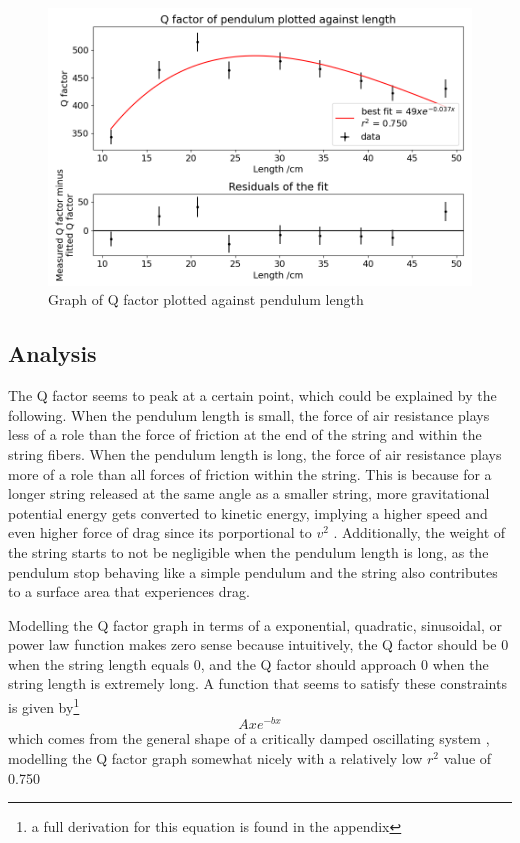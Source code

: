\documentclass[11pt]{article}
\begin{document}
\begin{multicols}{2}
{\begin{figure}[H]
    \centering
    \includegraphics[width=\linewidth]{../figures/qfactor_vs_length.png}
    \caption{\centering Graph of Q factor plotted against pendulum length}
    \label{fig:figure 8}
\end{figure}

\subsection{Analysis}
The Q factor seems to peak at a certain point, which could be explained by the following. When the pendulum length is small, the force of air resistance plays less of a role than the force of friction at the end of the string and within the string fibers. When the pendulum length is long, the force of air resistance plays more of a role than all forces of friction within the string. This is because for a longer string released at the same angle as a smaller string, more gravitational potential energy gets converted to kinetic energy, implying a higher speed and even higher force of drag since its porportional to $v^2$ \cite{airdrag}. Additionally, the weight of the string starts to not be negligible when the pendulum length is long, as the pendulum stop behaving like a simple pendulum and the string also contributes to a surface area that experiences drag.

Modelling the Q factor graph in terms of a exponential, quadratic, sinusoidal, or power law function makes zero sense because intuitively, the Q factor should be 0 when the string length equals 0, and the Q factor should approach 0 when the string length is extremely long. A function that seems to satisfy these constraints is given by\footnote{a full derivation for this equation is found in the appendix}
\begin{equation} \label{eq:crit-damp}
    Axe^{-bx}
\end{equation}
which comes from the general shape of a critically damped oscillating system \cite{crit-damping}, modelling the Q factor graph somewhat nicely with a relatively low $r^2$ value of 0.750

}
\end{multicols}
\end{document}
